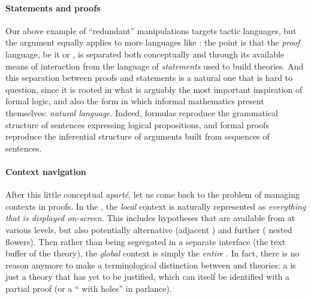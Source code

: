 \begin{scope}
\paragraph{Statements and proofs}

Our above example of ``redundant'' manipulations targets  tactic
languages, but the argument equally applies to more  languages
like : the point is that the \emph{proof} language, be it
 or , is separated both conceptually and through
its available means of interaction from the language of \emph{statements} used
to build theories. And this separation between proofs and statements is a
natural one that is hard to question, since it is rooted in what is arguably the
most important inspiration of formal logic, and also the form in which informal
mathematics present themselves: \emph{natural language}. Indeed, 
formulas reproduce the grammatical structure of sentences expressing logical
propositions, and formal proofs reproduce the inferential structure of arguments
built from sequences of sentences.

\paragraph{Context navigation}

After this little conceptual \textit{aparté}, let us come back to the problem of
managing contexts in proofs. In the , the \emph{local}
context is naturally represented as \emph{everything that is displayed
on-screen}. This includes hypotheses that are available from  at
various levels, but also potentially alternative  (adjacent
) and further  ( nested flowers). Then
rather than being segregated in a separate interface (the text buffer of the
theory), the \emph{global} context is simply the \emph{entire} . In
fact, there is no reason anymore to make a terminological distinction between
 and theories: a  is just a theory that has yet to be
justified, which can itself be identified with a partial proof (or a `` with holes'' in  parlance).


\end{scope}
